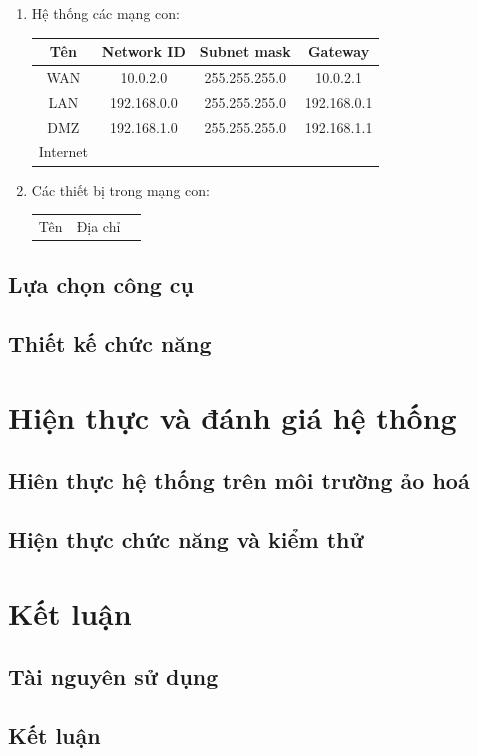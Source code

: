 \documentclass[12pt,titlepage,a4paper]{article}
\begin{document}
	\begin{enumerate}
		\item Hệ thống các mạng con:
		\begin{tabular}{|c|c|c|c|}
			Tên & Network ID & Subnet mask & Gateway
			\\
			\hline
			WAN & 10.0.2.0 & 255.255.255.0 & 10.0.2.1
			\\
			\hline
			LAN & 192.168.0.0 & 255.255.255.0 & 192.168.0.1
			\\
			\hline
			DMZ & 192.168.1.0 & 255.255.255.0 & 192.168.1.1
			\\
			\hline
			Internet & & &
			\\
			\hline 
		\end{tabular}
		\item Các thiết bị trong mạng con:
		\begin{tabular} {ccc}
			Tên & Địa chỉ 
		\end{tabular}
	\end{enumerate}

	
	\subsection{Lựa chọn công cụ}
	\subsection{Thiết kế chức năng}
	\section{Hiện thực và đánh giá hệ thống}
	\subsection{Hiên thực hệ thống trên môi trường ảo hoá}
	\subsection{Hiện thực chức năng và kiểm thử}
	\section{Kết luận}
	\subsection{Tài nguyên sử dụng}
	\subsection{Kết luận}
	
\end{document}
